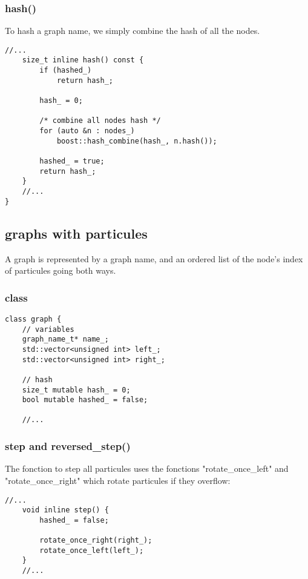 \documentclass[11pt]{article}
\begin{document}
\subsubsection{hash()}

To hash a graph name, we simply combine the hash of all the nodes.

\begin{lstlisting}[style=CStyle]
	//...
	size_t inline hash() const {
		if (hashed_)
			return hash_;

		hash_ = 0;

		/* combine all nodes hash */
		for (auto &n : nodes_)
			boost::hash_combine(hash_, n.hash());

		hashed_ = true;
		return hash_;
	}
	//...
}
\end{lstlisting}

\subsection{graphs with particules}

A graph is represented by a graph name, and an ordered list of the node's index of particules going both ways.

\subsubsection{class}

\begin{lstlisting}[style=CStyle]
class graph {
	// variables 
	graph_name_t* name_;
	std::vector<unsigned int> left_;
	std::vector<unsigned int> right_;

	// hash
	size_t mutable hash_ = 0;
	bool mutable hashed_ = false;

	//...
\end{lstlisting}

\subsubsection{step and reversed\_step()}

The fonction to step all particules uses the fonctions "rotate\_once\_left" and "rotate\_once\_right" which rotate particules if they overflow:

\begin{lstlisting}[style=CStyle]
	//...
	void inline step() {
  		hashed_ = false;

  		rotate_once_right(right_);
  		rotate_once_left(left_);
  	}
  	//...
\end{lstlisting}
\end{document}
